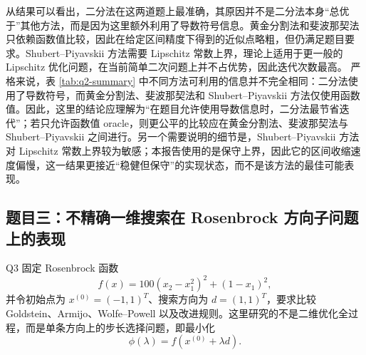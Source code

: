\documentclass[UTF8,a4paper,12pt,fontset=none]{ctexart}
\begin{document}
\begin{table}[H]
\centering
\scriptsize
{}
\caption{Q2 精确一维搜索结果摘要}
\label{tab:q2-summary}
\end{table}

从结果可以看出，二分法在这两道题上最准确，其原因并不是二分法本身“总优于”其他方法，而是因为这里额外利用了导数符号信息。黄金分割法和斐波那契法只依赖函数值比较，因此在给定区间精度下得到的近似点略粗，但仍满足题目要求。Shubert--Piyavskii 方法需要 Lipschitz 常数上界，理论上适用于更一般的 Lipschitz 优化问题，在当前简单二次问题上并不占优势，因此迭代次数最高。
严格来说，表 \ref{tab:q2-summary} 中不同方法可利用的信息并不完全相同：二分法使用了导数符号，而黄金分割法、斐波那契法和 Shubert--Piyavskii 方法仅使用函数值。因此，这里的结论应理解为“在题目允许使用导数信息时，二分法最节省迭代”；若只允许函数值 oracle，则更公平的比较应在黄金分割法、斐波那契法与 Shubert--Piyavskii 之间进行。另一个需要说明的细节是，Shubert--Piyavskii 方法对 Lipschitz 常数上界较为敏感；本报告使用的是保守上界，因此它的区间收缩速度偏慢，这一结果更接近“稳健但保守”的实现状态，而不是该方法的最佳可能表现。

\subsection{题目三：不精确一维搜索在 Rosenbrock 方向子问题上的表现}

Q3 固定 Rosenbrock 函数
\[
f(x)=100(x_2-x_1^2)^2+(1-x_1)^2,
\]
并令初始点为 $x^{(0)}=(-1,1)^T$、搜索方向为 $d=(1,1)^T$，要求比较 Goldstein、Armijo、Wolfe--Powell 以及改进规则。这里研究的不是二维优化全过程，而是单条方向上的步长选择问题，即最小化
\[
\phi(\lambda)=f(x^{(0)}+\lambda d).
\]
\end{document}

